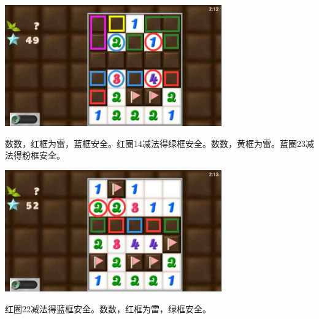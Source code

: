 \begin{center}
    \includegraphics[width=0.7\textwidth]{puzzlelow/229-4.jpg}
\end{center}
数数，红框为雷，蓝框安全。红圈14减法得绿框安全。数数，黄框为雷。蓝圈23减法得粉框安全。
\begin{center}
    \includegraphics[width=0.7\textwidth]{puzzlelow/229-5.jpg}
\end{center}
红圈22减法得蓝框安全。数数，红框为雷，绿框安全。

